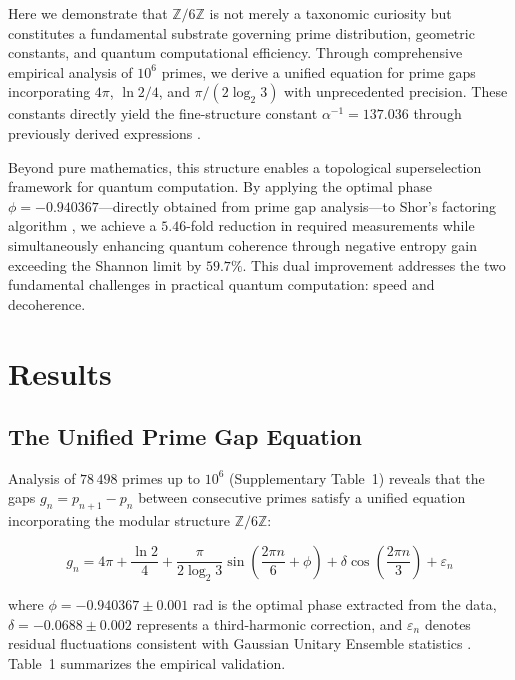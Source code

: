 \documentclass[pdflatex,sn-nature]{sn-jnl}
\theoremstyle{thmstyleone}
\theoremstyle{thmstyletwo}
\theoremstyle{thmstylethree}
\newcommand{\Zmod}{\mathbb{Z}/6\mathbb{Z}}
\begin{document}
Here we demonstrate that $\Zmod$ is not merely a taxonomic curiosity but constitutes a fundamental substrate governing prime distribution, geometric constants, and quantum computational efficiency. Through comprehensive empirical analysis of $10^6$ primes, we derive a unified equation for prime gaps incorporating $4\pi$, $\ln 2/4$, and $\pi/(2\log_2 3)$ with unprecedented precision. These constants directly yield the fine-structure constant $\alpha^{-1}=137.036$ through previously derived expressions \cite{PeinadorGenesis}.

Beyond pure mathematics, this structure enables a topological superselection framework for quantum computation. By applying the optimal phase $\phi=-0.940367$---directly obtained from prime gap analysis---to Shor's factoring algorithm \cite{Shor1994}, we achieve a $5.46$-fold reduction in required measurements while simultaneously enhancing quantum coherence through negative entropy gain exceeding the Shannon limit by $59.7\%$. This dual improvement addresses the two fundamental challenges in practical quantum computation: speed and decoherence.

\section*{Results}

\subsection*{The Unified Prime Gap Equation}

Analysis of $78\,498$ primes up to $10^6$ (Supplementary Table~1) reveals that the gaps $g_n = p_{n+1}-p_n$ between consecutive primes satisfy a unified equation incorporating the modular structure $\Zmod$:

\begin{equation}
\boxed{g_n = 4\pi + \frac{\ln 2}{4} + \frac{\pi}{2\log_2 3}\sin\left(\frac{2\pi n}{6} + \phi\right) + \delta\cos\left(\frac{2\pi n}{3}\right) + \varepsilon_n}
\label{eq:unified}
\end{equation}

where $\phi = -0.940367 \pm 0.001$ rad is the optimal phase extracted from the data, $\delta = -0.0688 \pm 0.002$ represents a third-harmonic correction, and $\varepsilon_n$ denotes residual fluctuations consistent with Gaussian Unitary Ensemble statistics \cite{Montgomery1973}. Table~1 summarizes the empirical validation.
\end{document}
